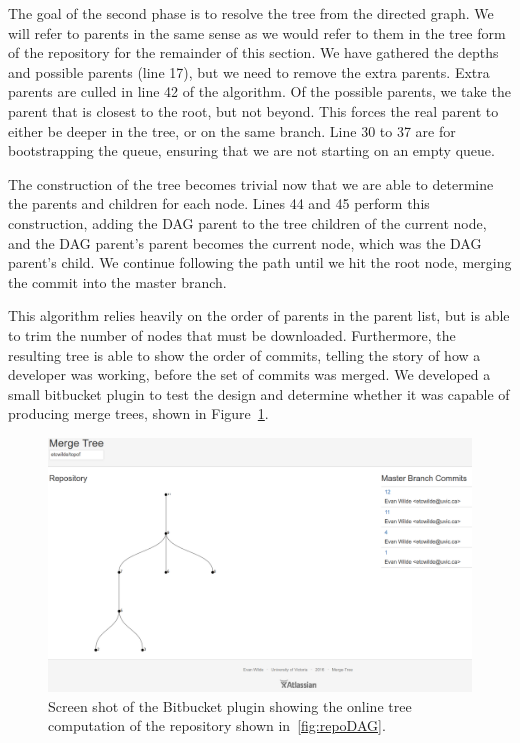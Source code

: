 \documentclass[draft]{IEEEtran}
\begin{document}
The goal of the second phase is to resolve the tree from the directed
graph. We will refer to parents in the same sense as we would refer to
them in the tree form of the repository for the remainder of this
section. We have gathered the depths and possible parents (line 17), but
we need to remove the extra parents. Extra parents are culled in line
42 of the algorithm. Of the possible parents, we take the parent that is
closest to the root, but not beyond. This forces the real parent to
either be deeper in the tree, or on the same branch. Line 30 to 37 are
for bootstrapping the queue, ensuring that we are not starting on an
empty queue.

The construction of the tree becomes trivial now that we are able to
determine the parents and children for each node. Lines 44 and 45
perform this construction, adding the DAG parent to the tree children of the
current node, and the DAG parent's parent becomes the current node,
which was the DAG parent's child. We continue following the path until
we hit the root node, merging the commit into the master branch.

This algorithm relies heavily on the order of parents in the parent
list, but is able to trim the number of nodes that must be downloaded.
Furthermore, the resulting tree is able to show the order of commits,
telling the story of how a developer was working, before the set of
commits was merged. We developed a small bitbucket plugin to test the
design and determine whether it was capable of producing merge trees,
shown in Figure~\ref{fig:b_plugin}.

\begin{figure}[htpb]
  \centering
  \includegraphics[width=\linewidth]{figures/plugin.png}
  \caption{Screen shot of the Bitbucket plugin showing the online tree
    computation of the repository shown in~\ref{fig:repoDAG}.}
  \label{fig:b_plugin}
\end{figure}
\end{document}
